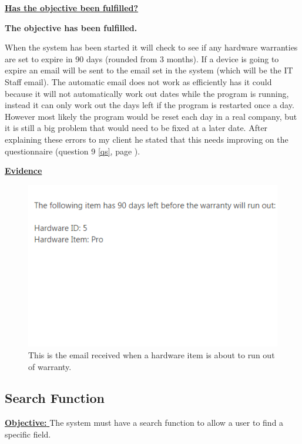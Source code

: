 \underline{\textbf{Has the objective been fulfilled?}}

\textbf{The objective has been fulfilled.}

When the system has been started it will check to see if any hardware warranties  are set to expire in 90 days (rounded from 3 months). If a device is going to expire an email will be sent to the email set in the system (which will be the IT Staff email). The automatic email does not work as efficiently has it could because it will not automatically work out dates while the program is running, instead it can only work out the days left if the program is restarted once a day. However most likely the program would be reset each day in a real company, but it is still a big problem that would need to be fixed at a later date. After explaining these errors to my client he stated that this needs improving on the questionnaire (question 9 \ref{qs}, page \pageref{qs}).

\underline{\textbf{Evidence}}

\begin{figure}[H]
    \includegraphics[width=\textwidth]{./Testing/Images/EmailExpiredHardware.png}
    \caption{This is the email received when a hardware item is about to run out of warranty.} 
\end{figure}



\subsection{Search Function}

\underline{\textbf{Objective:} } The system must have a search function to allow a user to find a specific field.

